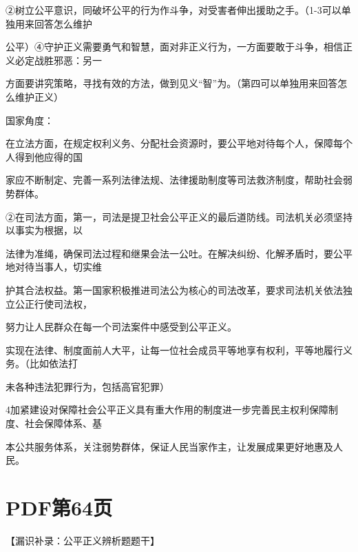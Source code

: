 \documentclass[lang=cn,11pt]{elegantbook}
\newcommand{\daofasym}[1]{{\daofasymbolfont #1}}
\newcommand{\daofasym}[1]{#1}
\begin{document}
\daofasym{②}树立公平意识，同破坏公平的行为作斗争，对受害者伸出援助之手。（1-3可以单独用来回答怎么维护\par

公平）\daofasym{④}守护正义需要勇气和智慧，面对非正义行为，一方面要敢于斗争，相信正义必定战胜邪恶：另一\par

方面要讲究策略，寻找有效的方法，做到见义“智”为。（第四可以单独用来回答怎么维护正义）\par

国家角度：\par

在立法方面，在规定权利义务、分配社会资源时，要公平地对待每个人，保障每个人得到他应得的国\par

家应不断制定、完善一系列法律法规、法律援助制度等司法救济制度，帮助社会弱势群体。\par

\daofasym{②}在司法方面，第一，司法是提卫社会公平正义的最后道防线。司法机关必须坚持以事实为根据，以\par

法律为准绳，确保司法过程和继果会法一公吐。在解决纠纷、化解矛盾时，要公平地对待当事人，切实维\par

护其合法权益。第一国家积极推进司法公为核心的司法改革，要求司法机关依法独立公正行使司法权，\par

努力让人民群众在每一个司法案件中感受到公平正义。\par

实现在法律、制度面前人大平，让每一位社会成员平等地享有权利，平等地履行义务。（比如依法打\par

未各种违法犯罪行为，包括高官犯罪）\par

4加紧建设对保障社会公平正义具有重大作用的制度进一步完善民主权利保障制度、社会保障体系、基\par

本公共服务体系，关注弱势群体，保证人民当家作主，让发展成果更好地惠及人民。\par


\section*{PDF第64页}

【漏识补录：公平正义辨析题题干】\par
\end{document}
